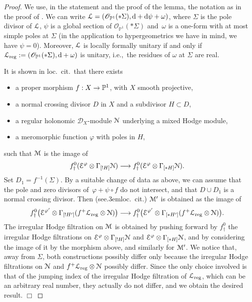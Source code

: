 \documentclass[11pt]{article}
\let\mathcal\mathscr
\def\cD{\mathcal{D}}
\def\cO{\mathcal{O}}
\def\PP{\mathbb{P}}
\def\ccE{\EuScript{E}}
\def\ccL{\EuScript{L}}
\def\ccM{\EuScript{M}}
\def\ccN{\EuScript{N}}
\def\cf{see\kern.3em}
\def\ie{i.e.,\ }
\newcommand{\regg}{{\mathrm{reg}}}
\newcommand{\rd}{{\mathrm{d}}}
\let\map f
\let\mero\varphi
\def\to{\mathchoice{\longrightarrow}{\rightarrow}{\rightarrow}{\rightarrow}}
\newcommand{\loccit}{loc.\ cit.}
\begin{document}
\begin{proof}
We use, in the statement and the proof of the lemma, the notation as in the proof of \cite[Prop.\,2.69]{Bibi15}. We can write $\ccL=(\cO_{\PP^1}(*\Sigma),\rd+\rd\psi+\omega)$, where $\Sigma$ is the pole divisor of $\ccL$, $\psi$ is a global section of $\cO_{\PP^1}(*\Sigma)$ and~$\omega$ is a one-form with at most simple poles at $\Sigma$ (in the application to hypergeometrics we have in mind, we have $\psi=0$). Moreover, $\ccL$ is locally formally unitary if and only if $\ccL_\regg:=(\cO_{\PP^1}(*\Sigma),\rd+\omega)$ is unitary, \ie the residues of $\omega$ at $\Sigma$ are real.

It is shown in \loccit\ that there exists
\begin{itemize}
\item
a proper morphism $\map:X\to\PP^1$, with $X$ smooth projective,
\item
a normal crossing divisor $D$ in $X$ and a subdivisor $H\subset D$,
\item
a regular holonomic $\cD_X$-module $\ccN$ underlying a mixed Hodge module,
\item
a meromorphic function $\mero$ with poles in $H$,
\end{itemize}
such that $\ccM$ is the image of
\[
\map^0_\dag(\ccE^\mero\otimes\Gamma_{[!H]}\ccN)\to \map^0_\dag(\ccE^\mero\otimes\Gamma_{[*H]}\ccN).
\]
Set $D_1=\map^{-1}(\Sigma)$. By a suitable change of data as above, we can assume that the pole and zero divisors of~\hbox{$\mero+\psi\circ\map$} do not intersect, and that $D\cup D_1$ is a normal crossing divisor. Then (\cf\loccit) $\ccM'$ is obtained as the image of
\[
\map^0_\dag\bigl(\ccE^{\mero'}\otimes\Gamma_{[!H']}(\map^+\ccL_\regg\otimes\ccN)\bigr)\to \map^0_\dag\bigl(\ccE^{\mero'}\otimes\Gamma_{[*H']}(\map^+\ccL_\regg\otimes\ccN)\bigr).
\]
The irregular Hodge filtration on $\ccM$ is obtained by pushing forward by $f^0_\dag$ the irregular Hodge filtrations on $\ccE^\mero\otimes\Gamma_{[!H]}\ccN$ and $\ccE^\mero\otimes\Gamma_{[*H]}\ccN$, and by considering the image of it by the morphism above, and similarly for $\ccM'$. We notice that, away from $\Sigma$, both constructions possibly differ only because the irregular Hodge filtrations on $\ccN$ and $\map^+\ccL_\regg\otimes\ccN$ possibly differ. Since the only choice involved is that of the jumping index of the irregular Hodge filtration of $\ccL_\regg$, which can be an arbitrary real number, they actually do not differ, and we obtain the desired result.
\hfill $\Box$
\end{proof}
\end{document}
